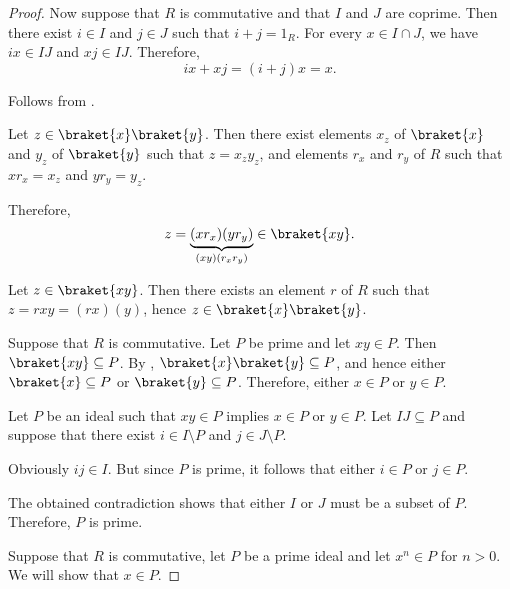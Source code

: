 \begin{proof}
  Now suppose that \( R \) is commutative and that \( I \) and \( J \) are coprime. Then there exist \( i \in I \) and \( j \in J \) such that \( i + j = 1_R \). For every \( x \in I \cap J \), we have \( ix \in IJ \) and \( xj \in IJ \). Therefore,
  \begin{equation*}
    ix + xj = (i + j)x = x.
  \end{equation*}

   Follows from .

  \hfill
  \SufficiencySubProof* Let \( z \in \braket{x} \braket{y} \). Then there exist elements \( x_z \) of \( \braket{x} \) and \( y_z \) of \( \braket{y} \) such that \( z = x_z y_z \), and elements \( r_x \) and \( r_y \) of \( R \) such that \( x r_x = x_z \) and \( y r_y = y_z \).

  Therefore,
  \begin{equation*}
    z = \underbrace{(x r_x) (y r_y)}_{(xy) (r_x r_y)} \in \braket{xy}.
  \end{equation*}

  \NecessitySubProof* Let \( z \in \braket{xy} \). Then there exists an element \( r \) of \( R \) such that \( z = rxy = (rx)(y) \), hence \( z \in \braket{x} \braket{y} \).

   Suppose that \( R \) is commutative.
  \SufficiencySubProof* Let \( P \) be prime and let \( xy \in P \). Then \( \braket{xy} \subseteq P \). By , \( \braket{x} \braket{y} \subseteq P \), and hence either \( \braket{x} \subseteq P \) or \( \braket{y} \subseteq P \). Therefore, either \( x \in P \) or \( y \in P \).

  \NecessitySubProof* Let \( P \) be an ideal such that \( xy \in P \) implies \( x \in P \) or \( y \in P \). Let \( IJ \subseteq P \) and suppose that there exist \( i \in I \setminus P \) and \( j \in J \setminus P \).

  Obviously \( ij \in I \). But since \( P \) is prime, it follows that either \( i \in P \) or \( j \in P \).

  The obtained contradiction shows that either \( I \) or \( J \) must be a subset of \( P \). Therefore, \( P \) is prime.

   Suppose that \( R \) is commutative, let \( P \) be a prime ideal and let \( x^n \in P \) for \( n > 0 \). We will show that \( x \in P \).


\end{proof}
